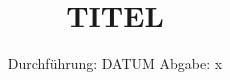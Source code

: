 

\subject{VERSUCH NUMMER}
\title{TITEL}
\date{%
  Durchführung: DATUM
  \hspace{3em}
  Abgabe: x
}


\maketitle
\thispagestyle{empty}
\tableofcontents
\newpage





\printbibliography{}


